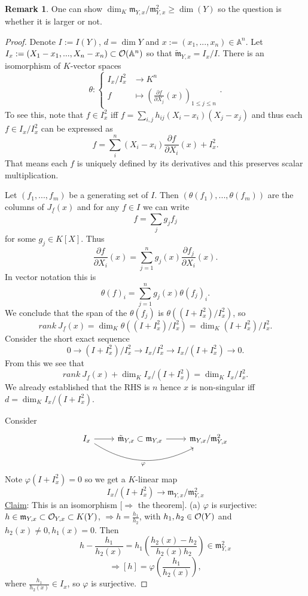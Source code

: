 \documentclass[11pt]{article}
\theoremstyle{definition}
\newtheorem{rmk}[thm]{Remark}
\newcommand{\affn}{\mathbb A}
\newcommand{\scm}{{\mathfrak m}}
\newcommand{\calo}{{\cal O}}
\newcommand{\pd}{\partial}
\newcommand{\Lrta}{\Longrightarrow}
\newcommand{\lrta}{\longrightarrow}
\begin{document}
\begin{rmk}
	One can show $\dim_K\scm_{Y,x}/\scm_{Y,x}^2\geq \dim (Y)$ so the question is whether it is larger or not. 
\end{rmk}

\begin{proof}
	Denote $I:=I(Y)$, $d= \dim Y$ and  $x:=(x_1,...,x_n)\in\affn^n$.
	Let $I_x:=(X_1-x_1,...,X_n-x_n)\subset \calo(\affn^n)$ so that $\tilde{\scm}_{Y,x}=I_x/I$.
	There  is an isomorphism of $K$-vector spaces
	$$
	\theta:\left\{\begin{aligned}
	I_x/I_x^2&\lrta K^n\\
	f&\longmapsto \left(\frac{\pd f}{\pd X_j}(x)\right)_{1\leq j\leq n}
	\end{aligned}\right. .
	$$
	To see this, note that $f\in I^2_x$ iff $f=\sum_{i,j}h_{ij}(X_i-x_i)(X_j-x_j)$ and thus each $f \in I_x/I_x^2$ can be expressed as
	$$
	f=\sum_{i}^n(X_i-x_i)\frac{\pd f}{\pd X_i}(x)+I_x^2.
	$$
	That means each $f$ is uniquely defined by its derivatives and this preserves scalar multiplication.
	
	Let $(f_1,...,f_m)$ be a generating set of $I$. Then $(\theta(f_1),...,\theta(f_m))$ are the columns of $J_{\underline{f}}(x)$ and for any $f\in I$ we can write
	$$
	f=\sum_j g_j f_j
	$$
	for some $g_j \in K[X]$. Thus
	$$
	\frac{\pd f}{\pd X_i}(x)=\sum^n_{j=1} g_j(x)\frac{\pd f_j}{\pd X_i}(x).
	$$
	In vector notation this is
	$$
	\theta(f)_i=\sum^n_{j=1} g_j(x) \theta(f_j)_i .
	$$
	We conclude that the span of the $\theta(f_j)$ is $\theta((I+I_x^2)/I_x^2)$, so 
	$$
	rank\  J_{\underline{f}}(x)=\dim_K\theta((I+I_x^2)/I_x^2) = \dim_K (I+I_x^2)/I_x^2 .
	$$
	Consider the short exact sequence
	$$
	0 \lrta (I +I_x^2)/I_x^2  \lrta I_x/I_x^2 \lrta I_x/(I+I_x^2)  \lrta 0 .
	$$
	From this we see that 
	$$ rank \ J_{\underline{f}}(x) + \dim_K  I_x/(I+I_x^2) = \dim_K I_x/I_x^2 .$$  
	We already established that the RHS is $n$ hence $x$ is non-singular iff 
	$d=\dim_K I_x/(I+I_x^2)$. 
	
	Consider 
	$$
	\begin{tikzcd}
	I_x \arrow[r] \arrow[rr, "\varphi"', bend right] & \tilde{\scm}_{Y,x}\subset \scm_{Y,x} \arrow[r] & \scm_{Y,x}/\scm_{Y,x}^2
	\end{tikzcd}
	$$
	Note $\varphi(I+I_x^2)=0$ so we get a $K$-linear map 
	$$
	I_x/(I+I_x^2)\lrta \scm_{Y,x}/\scm_{Y,x}^2
	$$
	\underline{Claim}: This is an isomorphism $[\Lrta$ the theorem].  
	(a) $\varphi$ is surjective: 
	$h\in \scm_{Y,x}\subset \calo_{Y,x}\subset K(Y)$, $\Lrta h=\frac{h_1}{h_2}$, with $h_1, h_2\in\calo(Y)$ and $h_2(x)\neq 0, h_1(x)=0$. Then $$
	h-\frac{h_1}{h_2(x)}=h_1\left(\frac{h_2(x)-h_2}{h_2(x)h_2}\right)\in\scm_{Y,x}^2$$
	$$
	\Lrta [h]=\varphi\left(\frac{h_1}{h_2(x)}\right),
	$$
	where $\frac{h_1}{h_2(x)}\in I_x$, so $\varphi$ is surjective.
	

\end{proof}
\end{document}
